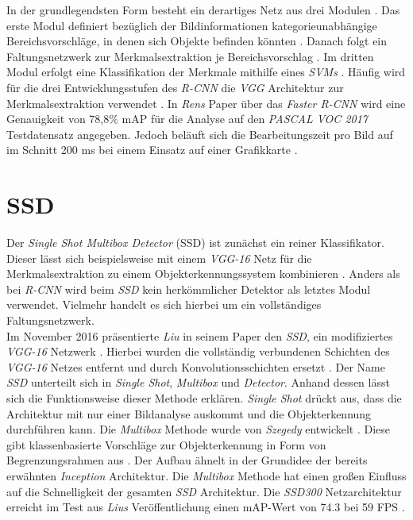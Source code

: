 		In der grundlegendsten Form besteht ein derartiges Netz aus drei Modulen \cite{rcnn}. Das erste Modul definiert bezüglich der Bildinformationen kategorieunabhängige Bereichsvorschläge, in denen sich Objekte befinden könnten \cite{rcnn}. Danach folgt ein Faltungsnetzwerk zur Merkmalsextraktion je Bereichsvorschlag \cite{rcnn}. Im dritten Modul erfolgt eine Klassifikation der Merkmale mithilfe eines \textit{SVMs} \cite{rcnn}. Häufig wird für die drei Entwicklungsstufen des \textit{R-CNN} die \textit{VGG} Architektur zur Merkmalsextraktion verwendet \cite{fastrcnn}. In \textit{Rens} Paper über das \textit{Faster R-CNN} wird eine Genauigkeit von 78,8$\percent$ mAP für die Analyse auf den \textit{PASCAL VOC 2017} Testdatensatz angegeben. Jedoch beläuft sich die Bearbeitungszeit pro Bild auf im Schnitt 200 ms bei einem Einsatz auf einer Grafikkarte \cite{fasterrcnn}.
		
		\section*{SSD}
		
		Der \textit{Single Shot Multibox Detector} (SSD) ist zunächst ein reiner Klassifikator. Dieser lässt sich beispielsweise mit einem \textit{VGG-16} Netz für die Merkmalsextraktion zu einem Objekterkennungssystem kombinieren \cite{ssd}. Anders als bei \textit{R-CNN} wird beim \textit{SSD} kein herkömmlicher Detektor als letztes Modul verwendet. Vielmehr handelt es sich hierbei um ein vollständiges Faltungsnetzwerk.\\
		
		Im November 2016 präsentierte \textit{Liu} in seinem Paper den \textit{SSD}, ein modifiziertes \textit{VGG-16} Netzwerk \cite{ssd}. Hierbei wurden die vollständig verbundenen Schichten des \textit{VGG-16} Netzes entfernt und durch Konvolutionsschichten ersetzt \cite{ssd}. Der Name \textit{SSD} unterteilt sich in \textit{Single Shot}, \textit{Multibox} und \textit{Detector}. Anhand dessen lässt sich die Funktionsweise dieser Methode erklären. \textit{Single Shot} drückt aus, dass die Architektur mit nur einer Bildanalyse auskommt und die Objekterkennung durchführen kann. Die \textit{Multibox} Methode wurde von \textit{Szegedy} entwickelt \cite{multibox}. Diese gibt klassenbasierte Vorschläge zur Objekterkennung in Form von Begrenzungsrahmen aus \cite{multibox}. Der Aufbau ähnelt in der Grundidee der bereits erwähnten \textit{Inception} Architektur. Die \textit{Multibox} Methode hat einen großen Einfluss auf die Schnelligkeit der gesamten \textit{SSD} Architektur. Die \textit{SSD300} Netzarchitektur erreicht im  Test aus \textit{Lius} Veröffentlichung einen mAP-Wert von 74.3 bei 59 FPS \cite{ssd}.\\
		

